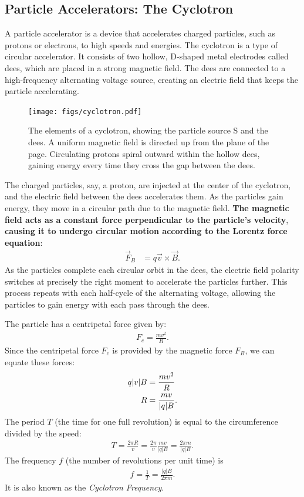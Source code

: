 \documentclass[12pt,b4paper]{article}
\begin{document}
\subsection{Particle Accelerators: The Cyclotron}
A particle accelerator is a device that accelerates charged particles, such as protons or electrons, to high speeds and energies. The cyclotron is a type of circular accelerator. It consists of two hollow, D-shaped metal electrodes called dees, which are placed in a strong magnetic field. The dees are connected to a high-frequency alternating voltage source, creating an electric field that keeps the particle accelerating.
\begin{figure}
    \centering
    \texttt{[image: figs/cyclotron.pdf]}
    \caption{The elements of a cyclotron, showing the particle source S and the dees. A uniform magnetic field is directed up from the plane of the page. Circulating protons spiral outward within the hollow dees, gaining energy every time they cross the gap between the dees.}
    \label{fig:cyclotron}
\end{figure}
The charged particles, say, a proton, are injected at the center of the cyclotron, and the electric field between the dees accelerates them. As the particles gain energy, they move in a circular path due to the magnetic field. \textbf{The magnetic field acts as a constant force perpendicular to the particle's velocity}, \textbf{causing it to undergo circular motion according to the Lorentz force equation}:
\begin{align}
    \vec{F}_B&=q\vec{v}\times\vec{B}.
\end{align}
As the particles complete each circular orbit in the dees, the electric field polarity switches at precisely the right moment to accelerate the particles further. This process repeats with each half-cycle of the alternating voltage, allowing the particles to gain energy with each pass through the dees.

The particle has a centripetal force given by:
\begin{align}
    F_c=\frac{mv^2}{R}.
\end{align}
Since the centripetal force $F_c$ is provided by the magnetic force $F_B$, we can equate these forces:
\begin{align}
    q|v|B&=\frac{mv^2}{R}\notag\\
    R&=\frac{mv}{|q|B}.
\end{align}
The period $T$ (the time for one full revolution) is equal to the circumference divided by the speed:
\begin{align}
    T=\frac{2\pi R}{v}=\frac{2\pi}{v}\frac{mv}{|q|B}=\frac{2\pi m}{|q|B}.
\end{align}
The frequency $f$ (the number of revolutions per unit time) is
\begin{align}
    f=\frac{1}{T}=\frac{|q|B}{2\pi m}.
\end{align}
It is also known as the \textit{Cyclotron Frequency}.
\end{document}
